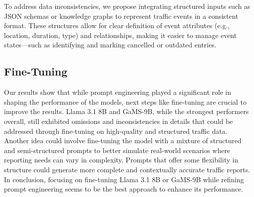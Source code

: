 \documentclass[fleqn,moreauthors,10pt]{ds_report}
\begin{document}
To address data inconsistencies, we propose integrating structured inputs such as JSON schemas or knowledge graphs to represent traffic events in a consistent format. These structures allow for clear definition of event attributes (e.g., location, duration, type) and relationships, making it easier to manage event states—such as identifying and marking cancelled or outdated entries.

\subsection*{Fine-Tuning}

Our results show that while prompt engineering played a significant role in shaping the performance of the models, next steps like fine-tuning are crucial to improve the results. Llama 3.1 8B and GaMS-9B, while the strongest performers overall, still exhibited omissions and inconsistencies in details that could be addressed through fine-tuning on high-quality and structured traffic data. Another idea could involve fine-tuning the model with a mixture of structured and semi-structured prompts to better simulate real-world scenarios where reporting needs can vary in complexity. Prompts that offer some flexibility in structure could generate more complete and contextually accurate traffic reports. In conclusion, focusing on fine-tuning Llama 3.1 8B or GaMS-9B while refining prompt engineering seems to be the best approach to enhance its performance.



\end{document}
